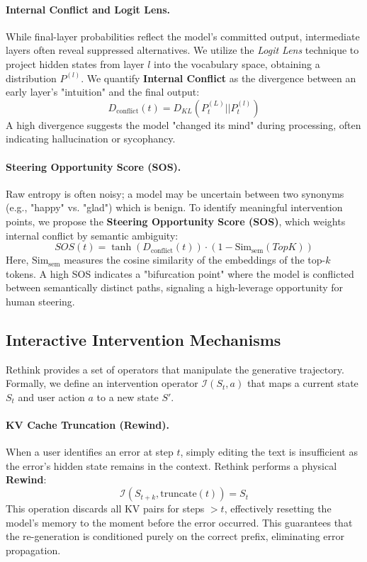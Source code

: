 \documentclass{article}
\begin{document}
\paragraph{Internal Conflict and Logit Lens.}
While final-layer probabilities reflect the model's committed output, intermediate layers often reveal suppressed alternatives. We utilize the \textit{Logit Lens} technique to project hidden states from layer $l$ into the vocabulary space, obtaining a distribution $P^{(l)}$. We quantify \textbf{Internal Conflict} as the divergence between an early layer's "intuition" and the final output:
\begin{equation}
    D_{\text{conflict}}(t) = D_{KL}(P^{(L)}_{t} || P^{(l)}_{t})
\end{equation}
A high divergence suggests the model "changed its mind" during processing, often indicating hallucination or sycophancy.

\paragraph{Steering Opportunity Score (SOS).}
Raw entropy is often noisy; a model may be uncertain between two synonyms (e.g., "happy" vs. "glad") which is benign. To identify meaningful intervention points, we propose the \textbf{Steering Opportunity Score (SOS)}, which weights internal conflict by semantic ambiguity:
\begin{equation}
    SOS(t) = \tanh(D_{\text{conflict}}(t)) \cdot (1 - \text{Sim}_{\text{sem}}(TopK))
\end{equation}
Here, $\text{Sim}_{\text{sem}}$ measures the cosine similarity of the embeddings of the top-$k$ tokens. A high SOS indicates a "bifurcation point" where the model is conflicted between semantically distinct paths, signaling a high-leverage opportunity for human steering.

\subsection{Interactive Intervention Mechanisms}
Rethink provides a set of operators that manipulate the generative trajectory. Formally, we define an intervention operator $\mathcal{I}(S_t, a)$ that maps a current state $S_t$ and user action $a$ to a new state $S'$.

\paragraph{KV Cache Truncation (Rewind).}
When a user identifies an error at step $t$, simply editing the text is insufficient as the error's hidden state remains in the context. Rethink performs a physical \textbf{Rewind}:
\begin{equation}
    \mathcal{I}(S_{t+k}, \text{truncate}(t)) = S_t
\end{equation}
This operation discards all KV pairs for steps $>t$, effectively resetting the model's memory to the moment before the error occurred. This guarantees that the re-generation is conditioned purely on the correct prefix, eliminating error propagation.
\end{document}
